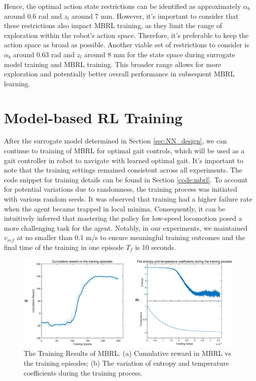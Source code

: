 Hence, the optimal action state restrictions can be identified as approximately $\alpha_b$ around 0.6 rad and $z_l$ around 7 mm. However, it's important to consider that these restrictions also impact MBRL training, as they limit the range of exploration within the robot's action space. Therefore, it's preferable to keep the action space as broad as possible. Another viable set of restrictions to consider is $\alpha_b$ around 0.63 rad and $z_l$ around 8 mm for the state space during surrogate model training and MBRL training. This broader range allows for more exploration and potentially better overall performance in subsequent MBRL learning.

\section{Model-based RL Training}
After the surrogate model determined in Section \ref{sec:NN_design}, we can continue to training of MBRL for optimal gait controls, which will be used as a gait controller in robot to navigate with learned optimal gait. It's important to note that the training settings remained consistent across all experiments. The code snippet for training details can be found in Section \ref{code:mbrl}. To account for potential variations due to randomness, the training process was initiated with various random seeds. It was observed that training had a higher failure rate when the agent became trapped in local minima. Consequently, it can be intuitively inferred that mastering the policy for low-speed locomotion posed a more challenging task for the agent. Notably, in our experiments, we maintained $v_{ref}$ at no smaller than 0.1 m/s to ensure meaningful training outcomes and the final time of the training in one episode $T_f$ is 10 seconds.
\begin{figure}[htb]
    \centering
    \includegraphics[width=\linewidth]{img/chap5/MBRL_tr.eps}
    \caption{The Training Results of MBRL. (a) Cumulative reward in MBRL vs the training episodes; (b) The variation of entropy and temperature coefficients during the training process.}
    \label{fig:MBRL_tr}
\end{figure}


